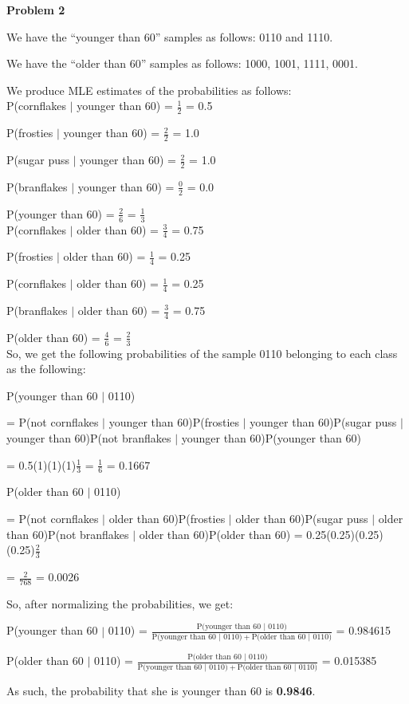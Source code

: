 \pagebreak\textbf{Problem 2}

We have the ``younger than 60'' samples as follows: 0110 and 1110.

We have the ``older than 60'' samples as follows: 1000, 1001, 1111, 0001.

We produce MLE estimates of the probabilities as follows: \\

P(cornflakes $\vert$ younger than 60) = $\frac{1}{2}$ = 0.5

P(frosties $\vert$ younger than 60) = $\frac{2}{2}$ = 1.0

P(sugar puss $\vert$ younger than 60) = $\frac{2}{2}$ = 1.0

P(branflakes $\vert$ younger than 60) = $\frac{0}{2}$ = 0.0

P(younger than 60) = $\frac{2}{6}$ = $\frac{1}{3}$ \\

P(cornflakes $\vert$ older than 60) = $\frac{3}{4}$ = 0.75

P(frosties $\vert$ older than 60) = $\frac{1}{4}$ = 0.25

P(cornflakes $\vert$ older than 60) = $\frac{1}{4}$ = 0.25

P(branflakes $\vert$ older than 60) = $\frac{3}{4}$ = 0.75

P(older than 60) = $\frac{4}{6}$ = $\frac{2}{3}$ \\

So, we get the following probabilities of the sample 0110 belonging to each class as the following:

P(younger than 60 $\vert$ 0110) 

= P(not cornflakes $\vert$ younger than 60)P(frosties $\vert$ younger than 60)P(sugar puss $\vert$ younger than 60)P(not branflakes $\vert$ younger than 60)P(younger than 60) 

= 0.5(1)(1)(1)$\frac{1}{3}$ = $\frac{1}{6}$ = 0.1667

P(older than 60 $\vert$ 0110) 

= P(not cornflakes $\vert$ older than 60)P(frosties $\vert$ older than 60)P(sugar puss $\vert$ older than 60)P(not branflakes $\vert$ older than 60)P(older than 60) = 0.25(0.25)(0.25)(0.25)$\frac{2}{3}$ 

= $\frac{2}{768}$ = 0.0026

So, after normalizing the probabilities, we get:

P(younger than 60 $\vert$ 0110) = $\frac{\text{P(younger than 60 $\vert$ 0110)}}{\text{P(younger than 60 $\vert$ 0110)} + \text{P(older than 60 $\vert$ 0110)}}$ = 0.984615

P(older than 60 $\vert$ 0110) = $\frac{\text{P(older than 60 $\vert$ 0110)}}{\text{P(younger than 60 $\vert$ 0110)} + \text{P(older than 60 $\vert$ 0110)}}$ = 0.015385

As such, the probability that she is younger than 60 is \textbf{0.9846}.